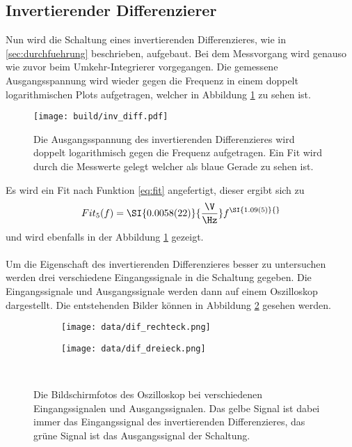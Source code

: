 \subsection{Invertierender Differenzierer}
Nun wird die Schaltung eines invertierenden Differenzieres, wie in \ref{sec:durchfuehrung} beschrieben, aufgebaut.
Bei dem Messvorgang wird genauso wie zuvor beim Umkehr-Integrierer vorgegangen.
Die gemessene Ausgangsspannung wird wieder gegen die Frequenz in einem doppelt logarithmischen Plots aufgetragen, welcher in Abbildung \ref{fig:inv_diff} zu sehen ist.
\begin{figure}[H]
    \centering
    \texttt{[image: build/inv\_diff.pdf]}
    \caption{Die Ausgangsspannung des invertierenden Differenzieres wird doppelt logarithmisch gegen die Frequenz aufgetragen.
    Ein Fit wird durch die Messwerte gelegt welcher als blaue Gerade zu sehen ist.}
    \label{fig:inv_diff}
\end{figure}
Es wird ein Fit nach Funktion \eqref{eq:fit} angefertigt, dieser ergibt sich zu 
\begin{equation*}
    Fit_5(f) = \SI{0.0058(22)}{\frac{\V}{\Hz}} f^{\SI{1.09(5)}{}}
\end{equation*}
und wird ebenfalls in der Abbildung \ref{fig:inv_diff} gezeigt.\\\\
Um die Eigenschaft des invertierenden Differenzieres besser zu untersuchen werden drei verschiedene Eingangssignale in die Schaltung gegeben.
Die Eingangssignale und Ausgangssignale werden dann auf einem Oszilloskop dargestellt.
Die entstehenden Bilder können in Abbildung \ref{fig:dif_oszi} gesehen werden.
\begin{figure}[H]
    \centering
    \begin{subfigure}{0.49\linewidth}%
        \texttt{[image: data/dif\_rechteck.png]}
    \end{subfigure}
    \hfill
    \begin{subfigure}{0.49\linewidth}%
        \texttt{[image: data/dif\_dreieck.png]}
    \end{subfigure}\\
    \caption{Die Bildschirmfotos des Oszilloskop bei verschiedenen Eingangssignalen und Ausgangssignalen.
    Das gelbe Signal ist dabei immer das Eingangssignal des invertierenden Differenzieres, das grüne Signal ist das Ausgangssignal der Schaltung.}
    \label{fig:dif_oszi}
\end{figure}
\FloatBarrier

